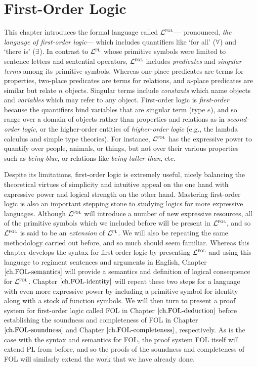 \chapter{First-Order Logic}
  \label{ch.FOL-syntax}

  
This chapter introduces the formal language called $\mathcal{L}^{\textsc{fol}}$--- pronounced, \textit{the language of first-order logic}--- which includes quantifiers like `for all' ($\forall$) and `there is' ($\exists$).
In contrast to $\mathcal{L}^{\textsc{pl}}$ whose primitive symbols were limited to sentence letters and sentential operators, $\mathcal{L}^{\textsc{fol}}$ includes \textit{predicates} and \textit{singular terms} among its primitive symbols.
Whereas one-place predicates are terms for properties, two-place predicates are terms for relations, and $n$-place predicates are similar but relate $n$ objects.
Singular terms include \textit{constants} which name objects and \textit{variables} which may refer to any object.
First-order logic is \textit{first-order} because the quantifiers bind variables that are singular term (type $e$), and so range over a domain of objects rather than properties and relations as in \textit{second-order logic}, or the higher-order entities of \textit{higher-order logic} (e.g., the lambda calculus and simple type theories).
For instance, $\mathcal{L}^{\textsc{fol}}$ has the expressive power to quantify over people, animals, or things, but not over their various properties such as \textit{being blue}, or relations like \textit{being taller than}, etc.

Despite its limitations, first-order logic is extremely useful, nicely balancing the theoretical virtues of simplicity and intuitive appeal on the one hand with expressive power and logical strength on the other hand.
Mastering first-order logic is also an important stepping stone to studying logics for more expressive languages.
Although $\mathcal{L}^{\textsc{fol}}$ will introduce a number of new expressive resources, all of the primitive symbols which we included before will be present in $\mathcal{L}^{\textsc{fol}}$, and so $\mathcal{L}^{\textsc{fol}}$ is said to be an \textit{extension} of $\mathcal{L}^{\textsc{pl}}$. 
We will also be repeating the same methodology carried out before, and so much should seem familiar.
Whereas this chapter develops the syntax for first-order logic by presenting $\mathcal{L}^{\textsc{fol}}$ and using this language to regiment sentences and arguments in English, Chapter $\ref{ch.FOL-semantics}$ will provide a semantics and definition of logical consequence for $\mathcal{L}^{\textsc{fol}}$.
Chapter $\ref{ch.FOL-identity}$ will repeat these two steps for a language with even more expressive power by including a primitive symbol for identity along with a stock of function symbols.
We will then turn to present a proof system for first-order logic called FOL in Chapter $\ref{ch.FOL-deduction}$ before establishing the soundness and completeness of FOL in Chapter $\ref{ch.FOL-soundness}$ and Chapter $\ref{ch.FOL-completeness}$, respectively.
As is the case with the syntax and semantics for FOL, the proof system FOL itself will extend PL from before, and so the proofs of the soundness and completeness of FOL will similarly extend the work that we have already done.





